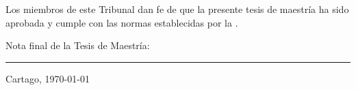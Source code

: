 \vfill

Los miembros de este Tribunal dan fe de que la presente tesis de
maestría ha sido aprobada y cumple con las normas establecidas por la
\thesisDepartment.

\vfill

\begin{center}
  Nota final de la Tesis de Maestría: \rule{3cm}{0.5pt}
\end{center}
\vfill

\begin{center}
  Cartago, \today\par
\end{center}

\cleardoublepage

